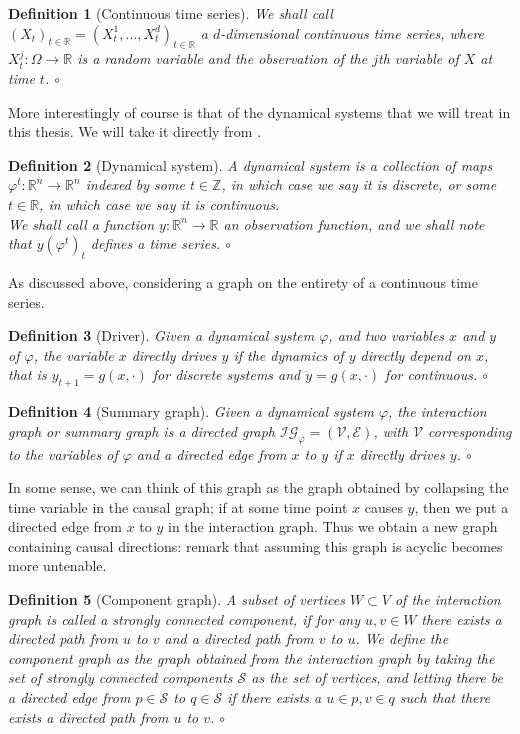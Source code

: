 \documentclass[11pt, a4paper]{memoir}
\theoremstyle{break}
\theoremstyle{break}
\newtheorem{innerdefn}{Definition}
\newenvironment{defn}
  {\begin{innerdefn}}
  {\ensuremath{\circ}\end{innerdefn}}
\theoremstyle{nonumberplain}
\newcommand{\mZ}{\mathbb{Z}}
\newcommand{\mR}{\mathbb{R}}
\begin{document}
\begin{defn}[Continuous time series]
We shall call $(X_t)_{t\in \mR}=(X_t^{1},\ldots,X_{t}^d)_{t\in \mR}$ a \emph{$d$-dimensional continuous time series}, where $X_t^j:\Omega\to \mR$ is a random variable and the observation of the $j$th variable of $X$ at time $t$.
\end{defn}
More interestingly of course is that of the dynamical systems that we will treat in this thesis. We will take it directly from \cite{mathFound}.
\begin{defn}[Dynamical system]
A \emph{dynamical system} is a collection of maps $\varphi^t:\mR^n\to\mR^n$ indexed by some $t\in \mZ$, in which case we say it is \emph{discrete}, or some $t\in \mR$, in which case we say it is \emph{continuous}.\\
We shall call a function $y:\mR^n\to \mR$ an \emph{observation function}, and we shall note that $y(\varphi^t)_t$ defines a time series.
\end{defn}
As discussed above, considering a graph on the entirety of a continuous time series.
\begin{defn}[Driver]
Given a dynamical system $\varphi$, and two variables $x$ and $y$ of $\varphi$, the variable $x$ \emph{directly drives} $y$ if the dynamics of $y$ directly depend on $x$, that is $y_{t+1}=g(x,\cdot)$ for discrete systems and $\dot{y}=g(x,\cdot)$ for continuous.
\end{defn}
\begin{defn}[Summary graph]
Given a dynamical system $\varphi$, the \emph{interaction graph} or \emph{summary graph} is a directed graph $\mathcal{IG}_\varphi=(\mathcal{V},\mathcal{E})$, with $\mathcal{V}$ corresponding to the variables of $\varphi$ and a directed edge from $x$ to $y$ if $x$ directly drives $y$.
\end{defn}
In some sense, we can think of this graph as the graph obtained by collapsing the time variable in the causal graph; if at some time point $x$ causes $y$, then we put a directed edge from $x$ to $y$ in the interaction graph. Thus we obtain a new graph containing causal directions: remark that assuming this graph is acyclic becomes more untenable.
\begin{defn}[Component graph]
A subset of vertices $W\subset V$ of the interaction graph is called a \emph{strongly connected component}, if for any $u,v\in W$ there exists a directed path from $u$ to $v$ and a directed path from $v$ to $u$. We define the \emph{component graph} as the graph obtained from the interaction graph by taking the set of strongly connected components $\mathcal{S}$ as the set of vertices, and letting there be a directed edge from $p\in \mathcal{S}$ to $q\in \mathcal{S}$ if there exists a $u\in p,v\in q$ such that there exists a directed path from $u$ to $v$.
\end{defn}
\end{document}

